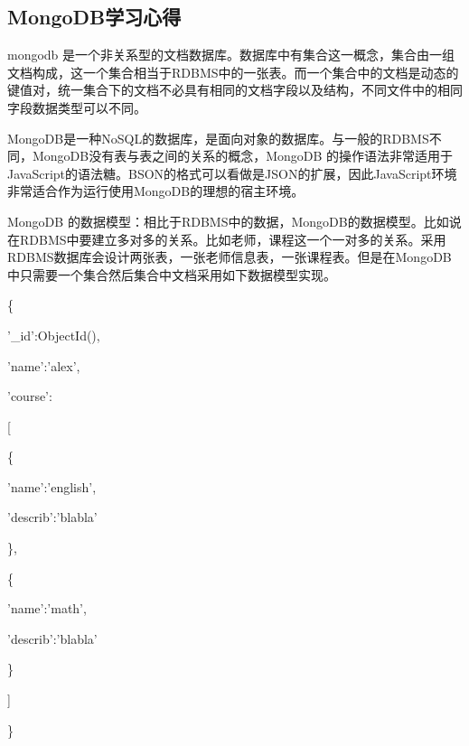 \documentclass[11pt, a4paper, oneside]{ctexart}
\begin{document}
\subsection{MongoDB学习心得}
mongodb 是一个非关系型的文档数据库。数据库中有集合这一概念，集合由一组文档构成，这一个集合相当于RDBMS中的一张表。而一个集合中的文档是动态的键值对，统一集合下的文档不必具有相同的文档字段以及结构，不同文件中的相同字段数据类型可以不同。

MongoDB是一种NoSQL的数据库，是面向对象的数据库。与一般的RDBMS不同，MongoDB没有表与表之间的关系的概念，MongoDB 的操作语法非常适用于JavaScript的语法糖。BSON的格式可以看做是JSON的扩展，因此JavaScript环境非常适合作为运行使用MongoDB的理想的宿主环境。

MongoDB 的数据模型：相比于RDBMS中的数据，MongoDB的数据模型。比如说在RDBMS中要建立多对多的关系。比如老师，课程这一个一对多的关系。采用RDBMS数据库会设计两张表，一张老师信息表，一张课程表。但是在MongoDB中只需要一个集合然后集合中文档采用如下数据模型实现。

\{

    \hspace{1cm}'\_id':ObjectId(),
    
    \hspace{1cm}'name':'alex',
    
    \hspace{1cm}'course':
    
    \hspace{1cm}[
    
    \hspace{2cm}\{
    
        \hspace{3cm}'name':'english',
        
        \hspace{3cm}'describ':'blabla'
        
    \hspace{2cm}\},
    
   \hspace{2cm}\{
    
        \hspace{3cm}'name':'math',
        
        \hspace{3cm}'describ':'blabla'
        
    \hspace{2cm}\} 
    
    \hspace{1cm}]
    
\}
\end{document}
